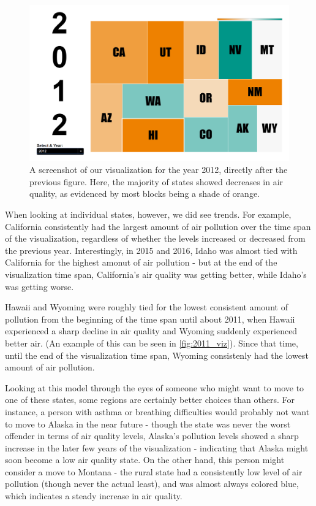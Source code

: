 \documentclass[journal]{vgtc}                %
\begin{document}
\begin{figure}
   \includegraphics[width=\columnwidth]{2012_viz.png}
   \caption{A screenshot of our visualization for the year 2012, directly after the previous figure. Here, the majority of states
   showed decreases in air quality, as evidenced by most blocks being a shade of orange.\label{fig:2012_viz}}
\end{figure}

When looking at individual states, however, we did see trends. For example, California consistently had the largest amount of air
pollution over the time span of the visualization, regardless of whether the levels increased or decreased from the previous year.
Interestingly, in 2015 and 2016, Idaho was almost tied with California for the highest amonut of air pollution - but at the end
of the visualization time span, California's air quality was getting better, while Idaho's was getting worse.

Hawaii and Wyoming were roughly tied for the lowest consistent amount of pollution from the beginning of the time span until about 2011, when Hawaii
experienced a sharp decline in air quality and Wyoming suddenly experienced better air. (An example of this can be seen in \ref{fig:2011_viz}).
Since that time, until the end of the visualization time span, Wyoming consistenly had the lowest amount of air pollution. 

Looking at this model through the eyes of someone who might want to move to one of these states, some regions are certainly better choices than 
others. For instance, a person with asthma or breathing difficulties would probably not want to move to Alaska in the near future - though
the state was never the worst offender in terms of air quality levels, Alaska's pollution levels showed a sharp increase in the later few
years of the visualization - indicating that Alaska might soon become a low air quality state. On the other hand, this person might consider
a move to Montana - the rural state had a consistently low level of air pollution (though never the actual least), and was almost always
colored blue, which indicates a steady increase in air quality.
\end{document}
